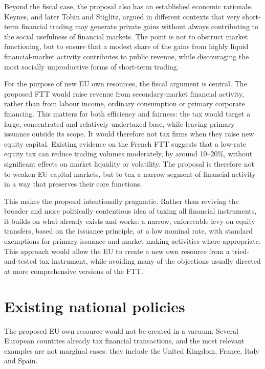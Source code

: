 \documentclass[../../main]{subfiles}
\begin{document}
Beyond the fiscal case, the proposal also has an established economic rationale. Keynes, and later Tobin and Stiglitz, argued in different contexts that very short-term financial trading may generate private gains without always contributing to the social usefulness of financial markets. The point is not to obstruct market functioning, but to ensure that a modest share of the gains from highly liquid financial-market activity contributes to public revenue, while discouraging the most socially unproductive forms of short-term trading.

For the purpose of new EU own resources, the fiscal argument is central. The proposed FTT would raise revenue from secondary-market financial activity, rather than from labour income, ordinary consumption or primary corporate financing. This matters for both efficiency and fairness: the tax would target a large, concentrated and relatively undertaxed base, while leaving primary issuance outside its scope. It would therefore not tax firms when they raise new equity capital. Existing evidence on the French FTT suggests that a low-rate equity tax can reduce trading volumes moderately, by around 10--20\%, without significant effects on market liquidity or volatility. The proposal is therefore not to weaken EU capital markets, but to tax a narrow segment of financial activity in a way that preserves their core functions.

This makes the proposal intentionally pragmatic. Rather than reviving the broader and more politically contentious idea of taxing all financial instruments, it builds on what already exists and works: a narrow, enforceable levy on equity transfers, based on the issuance principle, at a low nominal rate, with standard exemptions for primary issuance and market-making activities where appropriate. This approach would allow the EU to create a new own resource from a tried-and-tested tax instrument, while avoiding many of the objections usually directed at more comprehensive versions of the FTT.


\section{Existing national policies}
\label{sec:national_policies}

The proposed EU own resource would not be created in a vacuum. Several European countries already tax financial transactions, and the most relevant examples are not marginal cases: they include the United Kingdom, France, Italy and Spain. 
\end{document}
